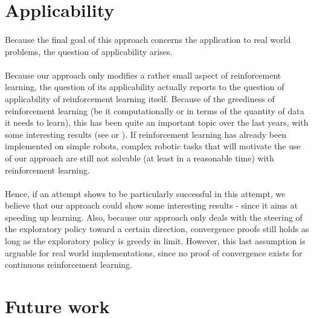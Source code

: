 \documentclass[a4paper]{report}
\begin{document}
{{		\section{Applicability}
		{
			\paragraph{} Because the final goal of this approach concerns the application to real world problems, the question of applicability arises. 
			
			\paragraph{} Because our approach only modifies a rather small aspect of reinforcement learning, the question of its applicability actually reports to the question of applicability of reinforcement learning itself. Because of the greediness of reinforcement learning (be it computationally or in terms of the quantity of data it needs to learn), this has been quite an important topic over the last years, with some interesting results (see \cite{hester2017learning} or \cite{fastrlslowrl}). If reinforcement learning has already been implemented on simple robots, complex robotic tasks that will motivate the use of our approach are still not solvable (at least in a reasonable time) with reinforcement learning. 
			
			\paragraph{} Hence, if an attempt shows to be particularly successful in this attempt, we believe that our approach could show some interesting results - since it aims at speeding up learning. Also, because our approach only deals with the steering of the exploratory policy toward a certain direction, convergence proofs still holds as long as the exploratory policy is greedy in limit. However, this last assumption is arguable for real world implementations, since no proof of convergence exists for continuous reinforcement learning. 
		}
		\section{Future work}
		{
}}}
\end{document}
